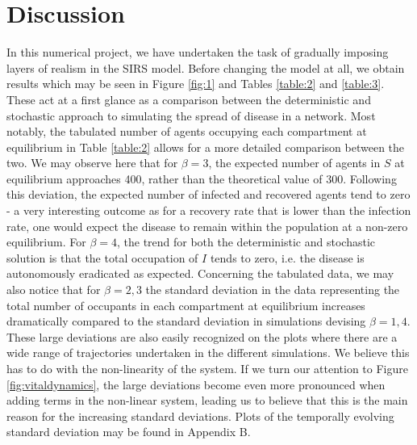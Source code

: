 \section{Discussion}
In this numerical project, we have undertaken the task of gradually imposing layers of realism in the SIRS model. Before changing the model at all, we obtain results which may be seen in Figure \ref{fig:1} and Tables \ref{table:2} and \ref{table:3}. These act at a first glance as a comparison between the deterministic and stochastic approach to simulating the spread of disease in a network. Most notably, the tabulated number of agents occupying each compartment at equilibrium in Table \ref{table:2} allows for a more detailed comparison between the two. We may observe here that for $\beta = 3$, the expected number of agents in $S$ at equilibrium approaches 400, rather than the theoretical value of $300$. Following this deviation, the expected number of infected and recovered agents tend to zero - a very interesting outcome as for a recovery rate that is lower than the infection rate, one would expect the disease to remain within the population at a non-zero equilibrium. For $\beta = 4$, the trend for both the deterministic and stochastic solution is that the total occupation of $I$ tends to zero, i.e. the disease is autonomously eradicated as expected. Concerning the tabulated data, we may also notice that for $\beta = 2,3$ the standard deviation in the data representing the total number of occupants in each compartment at equilibrium increases dramatically compared to the standard deviation in simulations devising $\beta = 1,4$. These large deviations are also easily recognized on the plots where there are a wide range of trajectories undertaken in the different simulations. We believe this has to do with the non-linearity of the system. If we turn our attention to Figure \ref{fig:vitaldynamics}, the large deviations become even more pronounced when adding terms in the non-linear system, leading us to believe that this is the main reason for the increasing standard deviations. Plots of the temporally evolving standard deviation may be found in Appendix B.\\

